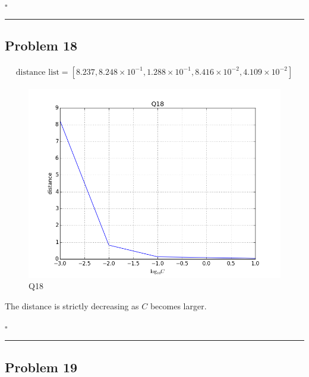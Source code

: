 \documentclass[12pt]{article}
\newcommand*{\QEDB}{\hfill\ensuremath{\square}}
\newcommand{\SBrackets}[1]{\left[#1\right]}
\newcommand{\SciNum}[2]{#1\times{10}^{#2}}
\newcommand{\horrule}[1]{\rule{\linewidth}{#1}}
\begin{document}
\QEDB

\horrule{0.5pt}

\subsection*{Problem 18}

\begin{align}
\text{distance list}=\SBrackets{8.237, \SciNum{8.248}{-1}, \SciNum{1.288}{-1}, \SciNum{8.416}{-2}, \SciNum{4.109}{-2}}
\end{align}
\begin{figure}[H]
	\centering
	\includegraphics[scale=0.5]{Q18.png}
	\caption{Q18}
	\label{Q18}
\end{figure}
The distance is strictly decreasing as $C$ becomes larger.

\QEDB

\horrule{0.5pt}

\subsection*{Problem 19}
\end{document}
